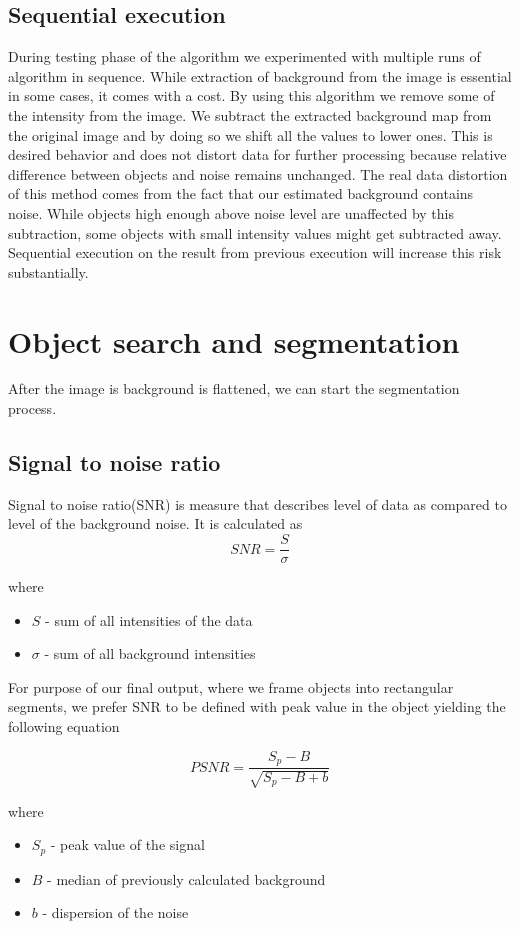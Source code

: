 \documentclass[12pt, a4paper, oneside]{book}
\begin{document}
\section{Sequential execution}
During testing phase of the algorithm we experimented with multiple runs of algorithm in sequence.
While extraction of background from the image is essential in some cases, it comes with a cost.
By using this algorithm we remove some of the intensity from the image.
We subtract the extracted background map from the original image and by doing so we shift all the values to lower ones.
This is desired behavior and does not distort data for further processing because relative difference between objects and noise remains unchanged.
The real data distortion of this method comes from the fact that our estimated background contains noise.
While objects high enough above noise level are unaffected by this subtraction, some objects with small intensity values might get subtracted away.
Sequential execution on the result from previous execution will increase this risk substantially.

\chapter{Object search and segmentation}
After the image is background is flattened, we can start the segmentation process.

\section{Signal to noise ratio}
Signal to noise ratio(SNR) is measure that describes level of data as compared to level of the background noise.
It is calculated as \cite{snr}
$$ SNR = \frac{S}{\sigma} $$

where

\begin{itemize}
    \item $S$ - sum of all intensities of the data
    \item $\sigma$ - sum of all background intensities
\end{itemize}

For purpose of our final output, where we frame objects into rectangular segments, we prefer SNR to be defined with peak value in the object yielding the following equation

$$ PSNR = \frac{S_p-B}{\sqrt{S_p-B+b}} $$

where

\begin{itemize}
    \item $S_p$ - peak value of the signal
    \item $B$ - median of previously calculated background
    \item $b$ - dispersion of the noise
\end{itemize}
\end{document}
